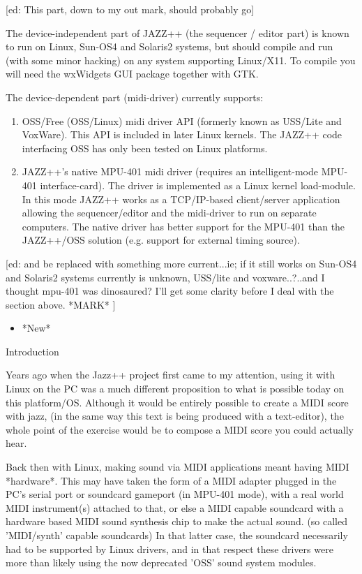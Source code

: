 \documentclass[letterpaper]{report}
\begin{document}
[ed: This part, down to my out mark, should probably go]

The device-independent part of JAZZ++ (the sequencer / editor part) is known
to run on Linux, Sun-OS4 and Solaris2 systems, but should compile and run
(with some minor hacking) on any system supporting Linux/X11. To compile you
will need the wxWidgets GUI package together with GTK.

The device-dependent part (midi-driver) currently supports:

\begin{enumerate}
\item OSS/Free (OSS/Linux) midi driver API (formerly known as USS/Lite and
VoxWare). This API is included in later Linux kernels. The JAZZ++ code
interfacing OSS has only been tested on Linux platforms.
\item JAZZ++'s native MPU-401 midi driver (requires an intelligent-mode MPU-401
interface-card). The driver is implemented as a Linux kernel
load-module. In this mode JAZZ++ works as a TCP/IP-based client/server
application allowing the sequencer/editor and the midi-driver to run on
separate computers. The native driver has better support for the MPU-401
than the JAZZ++/OSS solution (e.g. support for external timing source).
\end{enumerate}

[ed: and be replaced with something more current...ie; if it still
works on Sun-OS4 and Solaris2 systems currently is unknown, USS/lite
and voxware..?..and I thought mpu-401 was dinosaured? I'll get some
clarity before I deal with the section above. *MARK* ]

\begin{itemize}

\item *New*

\end{itemize}


Introduction

Years ago when the Jazz++ project first came to my attention,
using it with Linux on the PC was a much different proposition to
what is possible today on this platform/OS. Although it would be
entirely possible to create a MIDI score with jazz, (in the same way
this text is being produced with a text-editor), the whole point of
the exercise would be to compose a MIDI score you could actually hear.

Back then with Linux, making sound via MIDI applications meant having
MIDI *hardware*. This may have taken the form of a MIDI adapter plugged
in the PC's serial port or soundcard gameport (in MPU-401 mode), with a real
world MIDI instrument(s) attached to that, or else a MIDI capable soundcard
with a hardware based MIDI sound synthesis chip to make the actual sound.
(so called 'MIDI/synth' capable soundcards) In that latter case, the
soundcard necessarily had to be supported by Linux drivers, and in that
respect these drivers were more than likely using the now deprecated 'OSS'
sound system modules.
\end{document}
